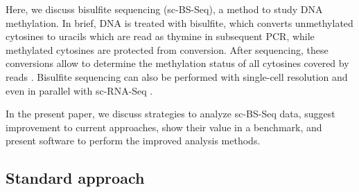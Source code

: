 \documentclass[twocolumn,10pt]{article}
\begin{document}
Here, we discuss bisulfite sequencing (sc-BS-Seq), a method to study DNA methylation. In brief, DNA is treated with bisulfite, which converts unmethylated cytosines to uracils which are read as thymine in subsequent PCR, while methylated cytosines are protected from conversion. After sequencing, these conversions allow to determine the methylation status of all cytosines covered by reads \citep{Frommer_1992}. Bisulfite sequencing can also be performed with single-cell resolution \citep{Smallwood_2014} and even in parallel with sc-RNA-Seq \citep{Clark2018}.

In the present paper, we discuss strategies to analyze sc-BS-Seq data, suggest improvement to current approaches, show their value in a benchmark, and present software to perform the improved analysis methods.

\subsection{Standard approach}
\end{document}
